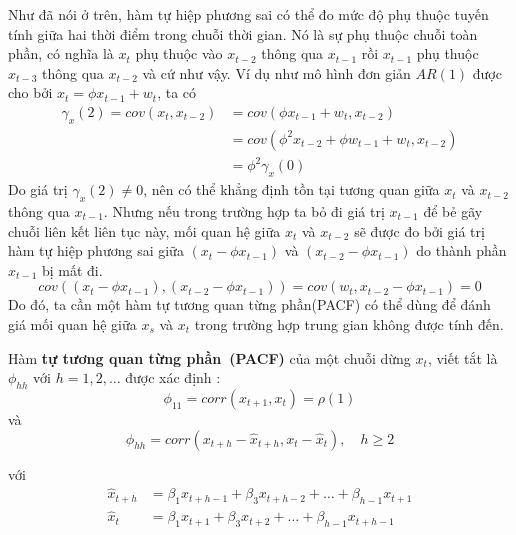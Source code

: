 Như đã nói ở trên, hàm tự hiệp phương sai có thể đo mức độ phụ thuộc tuyến tính giữa hai thời điểm trong chuỗi thời gian. Nó là sự phụ thuộc chuỗi toàn phần, có nghĩa là $x_t$ phụ thuộc vào $x_{t-2}$ thông qua $x_{t-1}$ rồi $x_{t-1}$ phụ thuộc $x_{t-3}$ thông qua $x_{t-2}$ và cứ như vậy. Ví dụ như mô hình đơn giản $AR(1)$ được cho bởi $x_t = \phi x_{t-1}+w_t$, ta có
\begin{align}
	\gamma_x(2) = cov(x_t,x_{t-2}) &= cov(\phi x_{t-1}+w_t,x_{t-2})\\
	&= cov(\phi^2x_{t-2}+\phi w_{t-1}+w_t,x_{t-2}) \\
	&= \phi^2\gamma_x(0)
\end{align} 
Do giá trị $\gamma_x(2) \neq 0$, nên có thể khẳng định tồn tại tương quan giữa $x_t$ và $x_{t-2}$ thông qua $x_{t-1}$. Nhưng nếu trong trường hợp ta bỏ đi giá trị $x_{t-1}$ để bẻ gãy chuỗi liên kết liên tục này, mối quan hệ giữa $x_t$ và $x_{t-2}$ sẽ được đo bởi giá trị hàm tự hiệp phương sai giữa $(x_t-\phi x_{t-1})$ và $(x_{t-2}-\phi x_{t-1})$ do thành phần $x_{t-1}$ bị mất đi.
\begin{equation}
	cov((x_t-\phi x_{t-1}),(x_{t-2}-\phi x_{t-1})) = cov (w_t,x_{t-2}-\phi x_{t-1}) = 0
\end{equation}
Do đó, ta cần một hàm tự tương quan từng phần(PACF) có thể dùng để đánh giá mối quan hệ giữa $x_s$ và $x_t$ trong trường hợp trung gian không được tính đến.

\begin{defi}
	Hàm \textbf{tự tương quan từng phần~(PACF)} của một chuỗi dừng $x_t$, viết tắt là $\phi_{hh}$ với $h=1,2,\dots$ được xác định :
	\begin{equation}
		\phi_{11} = corr(x_{t+1},x_t) = \rho(1)	
	\end{equation}
	 và
	 \begin{equation}
	 	\phi_{hh} = corr(x_{t+h}-\hat{x}_{t+h},x_{t}-\hat{x}_{t}),\quad h \geq 2
	 \end{equation}
\end{defi}
với 
\begin{align}
	\hat{x}_{t+h} &= \beta_{1}x_{t+h-1}+\beta_{3}x_{t+h-2}+\dots+\beta_{h-1}x_{t+1}\\
	\hat{x}_{t} &= \beta_{1}x_{t+1}+\beta_{3}x_{t+2}+\dots+\beta_{h-1}x_{t+h-1}	\label{hatx}
\end{align}

